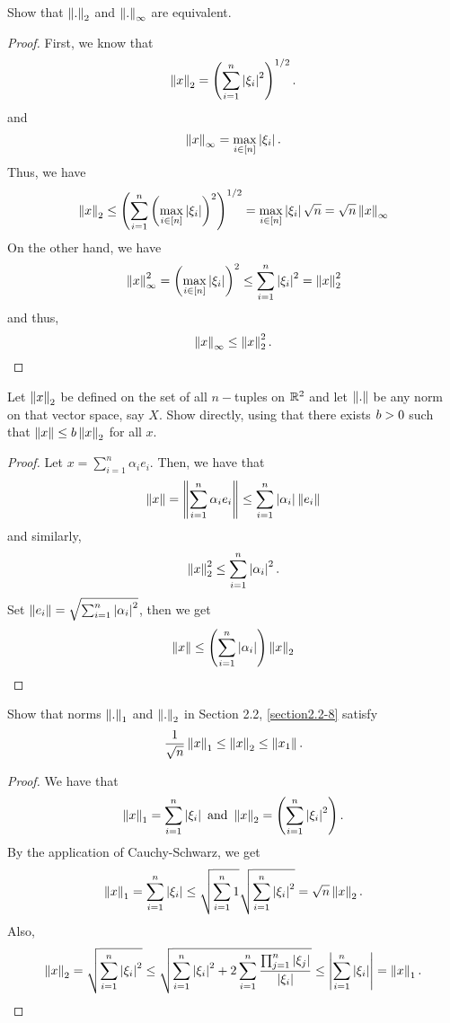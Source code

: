 \begin{question}
    Show that $\left\lVert . \right\rVert_2$ and $\left\lVert . \right\rVert_\infty$ are equivalent.
    \label{section2.4-6}
\end{question}
\begin{proof}
    First, we know that
    \[\left\lVert x \right\rVert_2 = \left( \sum_{i=1}^n \left\lvert \xi_i \right\rvert^2\right)^{1/2}.\]
    and
    \[\left\lVert x \right\rVert_\infty = \max_{i \in [n]} \left\lvert \xi_i \right\rvert.\]
    Thus, we have
    \[\left\lVert x \right\rVert_2 \leq \left( \sum_{i=1}^n \left( \max_{i \in [n]} \left\lvert \xi_i \right\rvert \right) ^2\right)^{1/2} = \max_{i \in [n]} \left\lvert \xi_i \right\rvert \sqrt{n} = \sqrt{n} \left\lVert x \right\rVert_\infty\]
    On the other hand, we have
    \[\left\lVert x \right\rVert_\infty^2 = \left(\max_{i \in [n]} \left\lvert \xi_i \right\rvert \right)^2 \leq \sum_{i=1}^n \left\lvert \xi_i \right\rvert^2 = \left\lVert x \right\rVert_2^2\]
    and thus, 
    \[\left\lVert x \right\rVert_\infty \leq \left\lVert x \right\rVert_2^2.\]
\end{proof}

\begin{question}
    Let $\left\lVert x \right\rVert_2$ be defined on the set of all $n-$tuples on $\mathbb{R}^2$ and let $\left\lVert . \right\rVert$ be any norm on that vector space, say $X$. Show directly, using that there exists $b > 0$ such that $\left\lVert x \right\rVert \leq b \left\lVert x \right\rVert_2$ for all $x$.
    \label{section2.4-7}
    \end{question}
    \begin{proof}
        Let $x = \sum_{i=1}^n \alpha_i e_i$. Then, we have that
        \[\left\lVert x \right\rVert = \left\lVert \sum_{i=1}^n \alpha_i e_i \right\rVert \leq \sum_{i=1}^n \left\lvert \alpha_i \right\rvert\left\lVert e_i \right\rVert\]
        and similarly, 
        \[\left\lVert x \right\rVert_2^2 \leq \sum_{i=1}^n \left\lvert \alpha_i \right\rvert^2.\]
        Set $\left\lVert e_i \right\rVert = \sqrt{\sum_{i=1}^n \left\lvert \alpha_i \right\rvert^2}$, then we get
        \[\left\lVert x \right\rVert \leq \left(\sum_{i=1}^n \left\lvert \alpha_i \right\rvert \right) \left\lVert x \right\rVert_2\]
    \end{proof}

    \begin{question}
        Show that norms $\left\lVert . \right\rVert_1$ and $\left\lVert . \right\rVert_2$ in Section 2.2, \ref{section2.2-8} satisfy
        \[\frac{1}{\sqrt{n}} \left\lVert x \right\rVert_1\leq \left\lVert x \right\rVert_2 \leq \left\lVert x_1 \right\rVert.\]
        \label{section2.4-8}
    \end{question}
    \begin{proof}
        We have that
        \[\left\lVert x \right\rVert_1 = \sum_{i=1}^n \left\lvert \xi_i \right\rvert \text{ and } \left\lVert x \right\rVert_2 = \left( \sum_{i=1}^n \left\lvert \xi_i \right\rvert^2 \right).\]
        By the application of Cauchy-Schwarz, we get
        \[\left\lVert x \right\rVert_1 = \sum_{i=1}^n \left\lvert \xi_i \right\rvert \leq \sqrt{\sum_{i=1}^n 1}\sqrt{\sum_{i=1}^n \left\lvert \xi_i \right\rvert^2} = \sqrt{n} \left\lVert x \right\rVert_2.\]
        Also,
        \[\left\lVert x \right\rVert_2 = \sqrt{\sum_{i=1}^n \left\lvert \xi_i \right\rvert^2} \leq \sqrt{\sum_{i=1}^n \left\lvert \xi_i \right\rvert^2 + 2 \sum_{i=1}^n \frac{\prod_{j=1}^n \left\lvert \xi_j \right\rvert}{\left\lvert \xi_i \right\rvert}} \leq \left\lvert \sum_{i=1}^n \left\lvert \xi_i \right\rvert \right\rvert = \left\lVert x \right\rVert_1.
        \]
    \end{proof}

